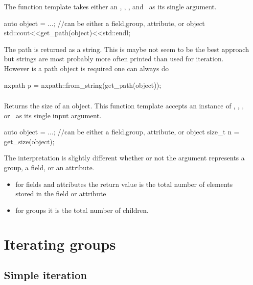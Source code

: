 The  function template takes either an \nxobject, \nxattribute,
\nxfield, and \nxgroup\ as its single argument.
\begin{cppcode}
auto object = ...; //can be either a field,group, attribute, or object
std::cout<<get_path(object)<<std::endl;
\end{cppcode}
The path is returned as a string. This is maybe not seem to be the best approach
but strings are most probably more often printed than used for iteration. 
However is a path object is required one can always do
\begin{cppcode}
nxpath p = nxpath::from_string(get_path(object));
\end{cppcode}

\subsubsection{\underline{}}

Returns the size of an object. This function template accepts an instance of 
\nxobject, \nxattribute, \nxfield, or \nxgroup\ as its single input argument.
\begin{cppcode}
auto object = ...; //can be either a field,group, attribute, or object
size_t n = get_size(object);
\end{cppcode}
The interpretation is slightly different whether or not the argument 
represents a group, a field, or an attribute. 
\begin{itemize}
\item for fields and attributes the return value is the total number of 
elements stored in the field or attribute 
\item for groups it is the total number of children.
\end{itemize}



\section{Iterating groups}\label{section:group_iteration}

\subsection{Simple iteration}

